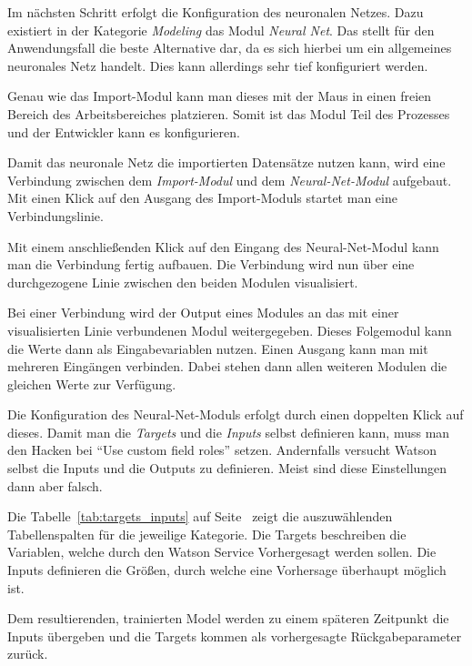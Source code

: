 Im nächsten Schritt erfolgt die Konfiguration des neuronalen Netzes. Dazu existiert in der Kategorie \textit{Modeling}
das Modul \textit{Neural Net}. Das stellt für den Anwendungsfall die beste Alternative dar, da es sich hierbei um ein
allgemeines neuronales Netz handelt. Dies kann allerdings sehr tief konfiguriert werden.

Genau wie das Import-Modul kann man dieses mit der Maus in einen freien Bereich des Arbeitsbereiches platzieren. Somit
ist das Modul Teil des Prozesses und der Entwickler kann es konfigurieren.

Damit das neuronale Netz die importierten Datensätze nutzen kann, wird eine Verbindung zwischen dem \textit{Import-Modul}
und dem \textit{Neural-Net-Modul} aufgebaut. Mit einen Klick auf den Ausgang des Import-Moduls startet man eine
Verbindungslinie.

Mit einem anschließenden Klick auf den Eingang des Neural-Net-Modul kann man die Verbindung fertig aufbauen. Die Verbindung
wird nun über eine durchgezogene Linie zwischen den beiden Modulen visualisiert.

Bei einer Verbindung wird der Output eines Modules an das mit einer visualisierten Linie verbundenen Modul weitergegeben.
Dieses Folgemodul kann die Werte dann als Eingabevariablen nutzen. Einen Ausgang kann man mit mehreren Eingängen
verbinden. Dabei stehen dann allen weiteren Modulen die gleichen Werte zur Verfügung.

Die Konfiguration des Neural-Net-Moduls erfolgt durch einen doppelten Klick auf dieses. Damit man die
\textit{Targets} und die \textit{Inputs} selbst definieren kann, muss man den Hacken bei \enquote{Use custom field roles}
setzen. Andernfalls versucht Watson selbst die Inputs und die Outputs zu definieren. Meist sind diese Einstellungen dann
aber falsch.

Die Tabelle~\ref{tab:targets_inputs} auf Seite~\pageref{tab:targets_inputs} zeigt die auszuwählenden Tabellenspalten für
die jeweilige Kategorie. Die Targets beschreiben die Variablen, welche durch den Watson Service Vorhergesagt werden
sollen. Die Inputs definieren die Größen, durch welche eine Vorhersage überhaupt möglich ist.

Dem resultierenden, trainierten Model werden zu einem späteren Zeitpunkt die Inputs übergeben und die Targets kommen als
vorhergesagte Rückgabeparameter zurück.

